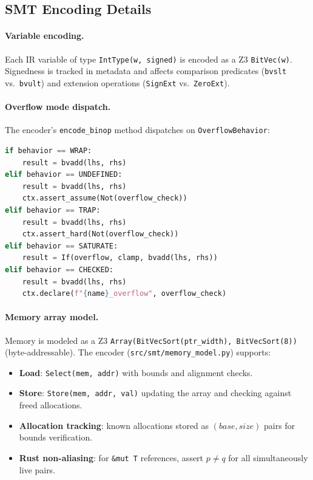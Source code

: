 \documentclass[10pt,a4paper]{article}
\begin{document}
\begin{appendices}
\subsection{SMT Encoding Details}

\paragraph{Variable encoding.}
Each IR variable of type \texttt{IntType(w, signed)} is encoded as a
Z3 \texttt{BitVec(w)}.  Signedness is tracked in metadata and affects
comparison predicates (\texttt{bvslt} vs.\ \texttt{bvult}) and
extension operations (\texttt{SignExt} vs.\ \texttt{ZeroExt}).

\paragraph{Overflow mode dispatch.}
The encoder's \texttt{encode\_binop} method dispatches on
\texttt{OverflowBehavior}:

\begin{lstlisting}[language=Python,title={\small Overflow encoding
dispatch (simplified from \texttt{src/smt/encoder.py})}]
if behavior == WRAP:
    result = bvadd(lhs, rhs)
elif behavior == UNDEFINED:
    result = bvadd(lhs, rhs)
    ctx.assert_assume(Not(overflow_check))
elif behavior == TRAP:
    result = bvadd(lhs, rhs)
    ctx.assert_hard(Not(overflow_check))
elif behavior == SATURATE:
    result = If(overflow, clamp, bvadd(lhs, rhs))
elif behavior == CHECKED:
    result = bvadd(lhs, rhs)
    ctx.declare(f"{name}_overflow", overflow_check)
\end{lstlisting}

\paragraph{Memory array model.}
Memory is modeled as a Z3 \texttt{Array(BitVecSort(ptr\_width),
BitVecSort(8))} (byte-addressable).  The encoder
(\texttt{src/smt/memory\_model.py}) supports:
\begin{itemize}[nosep]
  \item \textbf{Load}: \texttt{Select(mem, addr)} with bounds and
    alignment checks.
  \item \textbf{Store}: \texttt{Store(mem, addr, val)} updating the
    array and checking against freed allocations.
  \item \textbf{Allocation tracking}: known allocations stored as
    $(base, size)$ pairs for bounds verification.
  \item \textbf{Rust non-aliasing}: for \texttt{\&mut T} references,
    assert $p \neq q$ for all simultaneously live pairs.
\end{itemize}


\end{appendices}
\end{document}
